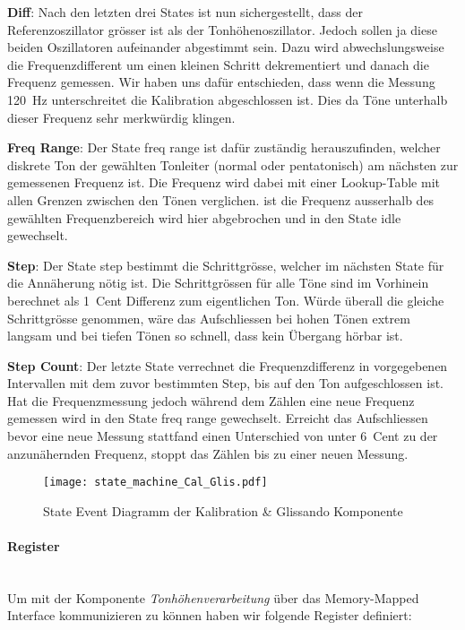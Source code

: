 \textbf{Diff}:
Nach den letzten drei States ist nun sichergestellt, dass der Referenzoszillator grösser ist als der Tonhöhenoszillator. Jedoch sollen ja diese beiden Oszillatoren aufeinander abgestimmt sein. Dazu wird abwechslungsweise die Frequenzdifferent um einen kleinen Schritt dekrementiert und danach die Frequenz gemessen. Wir haben uns dafür entschieden, dass wenn die Messung \SI{120}{Hz} unterschreitet die Kalibration abgeschlossen ist. Dies da Töne unterhalb dieser Frequenz sehr merkwürdig klingen.

\textbf{Freq Range}:
Der State freq range ist dafür zuständig herauszufinden, welcher diskrete Ton der gewählten Tonleiter (normal oder pentatonisch) am nächsten zur gemessenen Frequenz ist. Die Frequenz wird dabei mit einer Lookup-Table mit allen Grenzen zwischen den Tönen verglichen. ist die Frequenz ausserhalb des gewählten Frequenzbereich wird hier abgebrochen und in den State idle gewechselt.

\textbf{Step}:
Der State step bestimmt die Schrittgrösse, welcher im nächsten State für die Annäherung nötig ist. Die Schrittgrössen für alle Töne sind im Vorhinein berechnet als \SI{1}{Cent} Differenz zum eigentlichen Ton. Würde überall die gleiche Schrittgrösse genommen, wäre das Aufschliessen bei hohen Tönen extrem langsam und bei tiefen Tönen so schnell, dass kein Übergang hörbar ist. 

\textbf{Step Count}:
Der letzte State verrechnet die Frequenzdifferenz in vorgegebenen Intervallen mit dem zuvor bestimmten Step, bis auf den Ton aufgeschlossen ist. Hat die Frequenzmessung jedoch während dem Zählen eine neue Frequenz gemessen wird in den State freq range gewechselt. Erreicht das Aufschliessen bevor eine neue Messung stattfand einen Unterschied von unter \SI{6}{Cent} zu der anzunähernden Frequenz, stoppt das Zählen bis zu einer neuen Messung.

\begin{figure}[h!]
	\centering
	\texttt{[image: state\_machine\_Cal\_Glis.pdf]}
	\caption{State Event Diagramm der Kalibration \& Glissando Komponente} 
	\label{img:state_event_Cal_Glis}
\end{figure} 

\paragraph{Register}\mbox{}\\
Um mit der Komponente \textit{Tonhöhenverarbeitung} über das Memory-Mapped Interface kommunizieren zu können haben wir folgende Register definiert:

